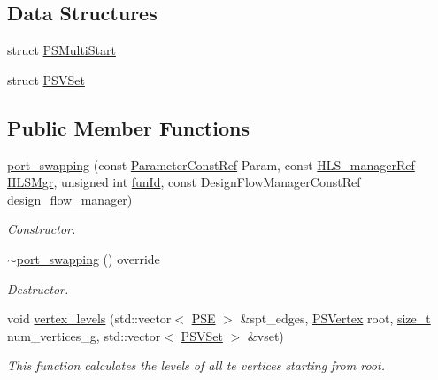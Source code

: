 \subsection*{Data Structures}
\begin{DoxyCompactItemize}
\item 
struct \hyperlink{structport__swapping_1_1PSMultiStart}{P\+S\+Multi\+Start}
\item 
struct \hyperlink{structport__swapping_1_1PSVSet}{P\+S\+V\+Set}
\end{DoxyCompactItemize}
\subsection*{Public Member Functions}
\begin{DoxyCompactItemize}
\item 
\hyperlink{classport__swapping_a153922be16a92229d34599fbe1085441}{port\+\_\+swapping} (const \hyperlink{Parameter_8hpp_a37841774a6fcb479b597fdf8955eb4ea}{Parameter\+Const\+Ref} Param, const \hyperlink{hls__manager_8hpp_acd3842b8589fe52c08fc0b2fcc813bfe}{H\+L\+S\+\_\+manager\+Ref} \hyperlink{classHLS__step_ade85003a99d34134418451ddc46a18e9}{H\+L\+S\+Mgr}, unsigned int \hyperlink{classHLSFunctionStep_a3e6434fd86c698b0c70520b859bff5b0}{fun\+Id}, const Design\+Flow\+Manager\+Const\+Ref \hyperlink{classDesignFlowStep_ab770677ddf087613add30024e16a5554}{design\+\_\+flow\+\_\+manager})
\begin{DoxyCompactList}\small\item\em Constructor. \end{DoxyCompactList}\item 
\hyperlink{classport__swapping_a8830702aef347ef2f566ffd3f9f08a1c}{$\sim$port\+\_\+swapping} () override
\begin{DoxyCompactList}\small\item\em Destructor. \end{DoxyCompactList}\item 
void \hyperlink{classport__swapping_a583aa110ac72c2910915c371c7fcde12}{vertex\+\_\+levels} (std\+::vector$<$ \hyperlink{classport__swapping_ac98b23b7c2dd3f3792327fb666489d66}{P\+SE} $>$ \&spt\+\_\+edges, \hyperlink{classport__swapping_a9588366dd46f9f32aab2c8de93d5679f}{P\+S\+Vertex} root, \hyperlink{tutorial__fpt__2017_2intro_2sixth_2test_8c_a7c94ea6f8948649f8d181ae55911eeaf}{size\+\_\+t} num\+\_\+vertices\+\_\+g, std\+::vector$<$ \hyperlink{structport__swapping_1_1PSVSet}{P\+S\+V\+Set} $>$ \&vset)
\begin{DoxyCompactList}\small\item\em This function calculates the levels of all te vertices starting from root. \end{DoxyCompactList}\item 

\end{DoxyCompactItemize}
